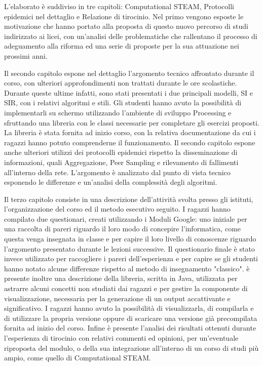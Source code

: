 L'elaborato è suddiviso in tre capitoli: Computational STEAM, Protocolli epidemici nel dettaglio e Relazione di tirocinio. Nel primo vengono esposte le motivazione che hanno portato alla proposta di questo nuovo percorso di studi indirizzato ai licei, con un'analisi delle problematiche che rallentano il processo di adeguamento alla riforma ed una serie di proposte per la sua attuazione nei prossimi anni. 

Il secondo capitolo espone nel dettaglio l'argomento tecnico affrontato durante il corso, con ulteriori approfondimenti non trattati durante le ore scolastiche. Durante queste ultime infatti, sono stati presentati i due principali modelli, SI e SIR, con i relativi algoritmi e stili. Gli studenti hanno avuto la possibilità di implementarli su schermo utilizzando l'ambiente di sviluppo Processing e sfruttando una libreria con le classi necessarie per completare gli esercizi proposti. La libreria è stata fornita ad inizio corso, con la relativa documentazione da cui i ragazzi hanno potuto comprenderne il funzionamento. Il secondo capitolo espone anche ulteriori utilizzi dei protocolli epidemici rispetto la disseminazione di informazioni, quali Aggregazione, Peer Sampling e rilevamento di fallimenti all'interno della rete. L'argomento è analizzato dal punto di vista tecnico esponendo le differenze e un'analisi della complessità degli algoritmi.

Il terzo capitolo consiste in una descrizione dell'attività svolta presso gli istituti, l'organizzazione del corso ed il metodo esecutivo seguito. I ragazzi hanno compilato due questionari, creati utilizzando i Moduli Google: uno iniziale per una raccolta di pareri riguardo il loro modo di concepire l'informatica, come questa venga insegnata in classe e per capire il loro livello di conoscenze riguardo l'argomento presentato durante le lezioni successive. Il questionario finale è stato invece utilizzato per raccogliere i pareri dell'esperienza e per capire se gli studenti hanno notato alcune differenze rispetto al metodo di insegnamento "classico". è presente inoltre una descrizione della libreria, scritta in Java, utilizzata per astrarre alcuni concetti non studiati dai ragazzi e per gestire la componente di visualizzazione, necessaria per la generazione di un output accattivante e significativo. I ragazzi hanno avuto la possibilità di visualizzarla, di compilarla e di utilizzare la propria versione oppure di scaricare una versione già precompilata fornita ad inizio del corso. Infine è presente l'analisi dei risultati ottenuti durante l'esperienza di tirocinio con relativi commenti ed opinioni, per un'eventuale riproposta del modulo, o della sua integrazione all'interno di un corso di studi più ampio, come quello di Computational STEAM.

